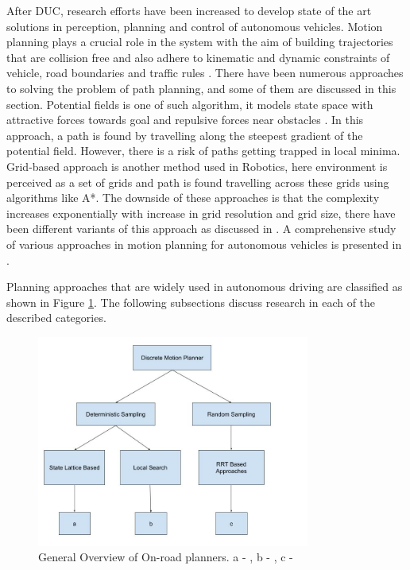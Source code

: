 After DUC, research efforts have been increased to develop state of the art solutions in perception, planning and control of autonomous vehicles. Motion planning plays a crucial role in the system with the aim of building trajectories that are collision free and also adhere to kinematic and dynamic constraints of vehicle, road boundaries and traffic rules \cite{motion_planning_techniques}. There have been numerous approaches to solving the problem of path planning, and some of them are discussed in this section. Potential fields is one of such algorithm, it models state space with attractive forces towards goal and repulsive forces near obstacles \cite{potential_field_3} \cite{potential_field_1} \cite{potential_field_2}. In this approach, a path is found by travelling along the steepest gradient of the potential field. However, there is a risk of paths getting trapped in local minima. Grid-based approach is another method used in Robotics, here environment is perceived as a set of grids and path is found travelling across these grids using algorithms like A*. The downside of these approaches is that the complexity increases exponentially with increase in grid resolution and grid size, there have been different variants of this approach as discussed in \cite{A_star} \cite{D_star_1} \cite{kolski_thesis}. A comprehensive study of various approaches in motion planning for autonomous vehicles is presented in \cite{motion_planning_techniques} \cite{survey_planning_techniques}.

 Planning approaches that are widely used in autonomous driving are classified as shown in Figure \ref{related_work_classification}. The following subsections discuss research in each of the described categories. 

\begin{figure}
	\centering
	\includegraphics[width=0.8\textwidth]{Images/related_work/planning_division.jpg}
	\caption{General Overview of On-road planners. a - \cite{cmu_parallel_thesis}  \cite{diss_shui_phd_thesis} \cite{traj_planner_optimization} \cite{lattice_Gu_Tiyanu} \cite{unit_A_star} , b - \cite{kolski_thesis} \cite{real_time_traj_plan_article} \cite{darpa_urban_challenge}, c -\cite{rrt_star} \cite{rrt_urban_driv} \cite{mit_rrt1}
	}
	\label{related_work_classification}
\end{figure}

